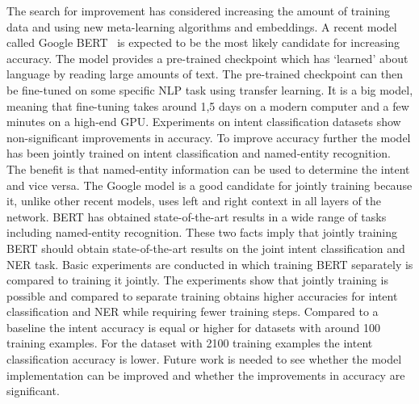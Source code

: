 The search for improvement has considered increasing the amount of training data and using new meta-learning algorithms and embeddings.
A recent model called Google BERT~\citep{devlin2018} is expected to be the most likely candidate for increasing accuracy.
The model provides a pre-trained checkpoint which has `learned' about language by reading large amounts of text.
The pre-trained checkpoint can then be fine-tuned on some specific NLP task using transfer learning.
It is a big model, meaning that fine-tuning takes around 1,5 days on a modern computer and a few minutes on a high-end GPU.
Experiments on intent classification datasets show non-significant improvements in accuracy.
To improve accuracy further the model has been jointly trained on intent classification and named-entity recognition.
The benefit is that named-entity information can be used to determine the intent and vice versa.
The Google model is a good candidate for jointly training because it, unlike other recent models, uses left and right context in all layers of the network.
BERT has obtained state-of-the-art results in a wide range of tasks including named-entity recognition.
These two facts imply that jointly training BERT should obtain state-of-the-art results on the joint intent classification and NER task.
Basic experiments are conducted in which training BERT separately is compared to training it jointly.
The experiments show that jointly training is possible and compared to separate training obtains higher accuracies for intent classification and NER while requiring fewer training steps.
Compared to a baseline the intent accuracy is equal or higher for datasets with around 100 training examples.
For the dataset with 2100 training examples the intent classification accuracy is lower.
Future work is needed to see whether the model implementation can be improved and whether the improvements in accuracy are significant.

\iffalse
In general the NLP field is in an interesting state.
Technology companies have a lot of incentive to push the field forward.
Leaps in the last few years have come from those companies.
For example, FastText by Facebook and transformer models by Google.
A second observation is that state-of-the-art scores are increased every few months.
This results in papers which are quickly pushed to arXiv and cited before any scholarly peer review.
Papers report accuracy high scores with ``few mentions of average cases and variability or worst-cases''~\citep{otter2018survey}.

A recent review paper for deep learning and NLP~\citep{young2018recent} still see lots of potential.
They expect better models for unlabelled data, reinforcement learning, zero-shot learning and network memory enrichment via a knowledge base.

\fi

